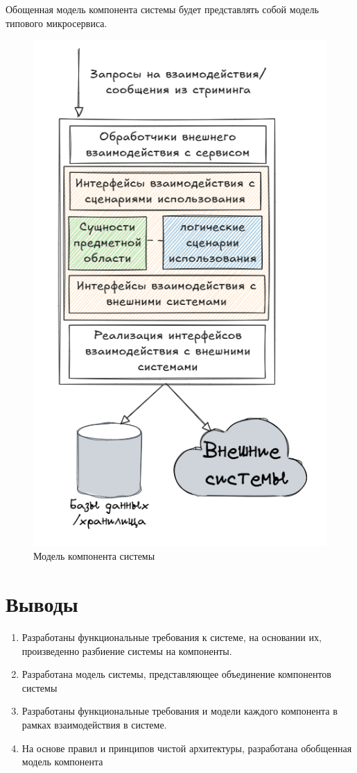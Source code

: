Обощенная модель компонента системы будет представлять собой модель типового микросервиса.

\begin{figure}[H]%
	\begin{center}
		\includegraphics[width=.6\columnwidth]{./img/new/component_model.png}%
	\end{center}
	\caption{Модель компонента системы}%
	\label{pic:component_model}%
\end{figure}

\section{Выводы}

\begin{enumerate}
	\item Разработаны функциональные требования к системе, на основании их, произведенно разбиение системы на компоненты.
	\item Разработана модель системы, представляющее объединение компонентов системы
	\item Разработаны функциональные требования и модели каждого компонента в рамках взаимодействия в системе.
	\item На основе правил и принципов чистой архитектуры, разработана обобщенная модель компонента
\end{enumerate}

